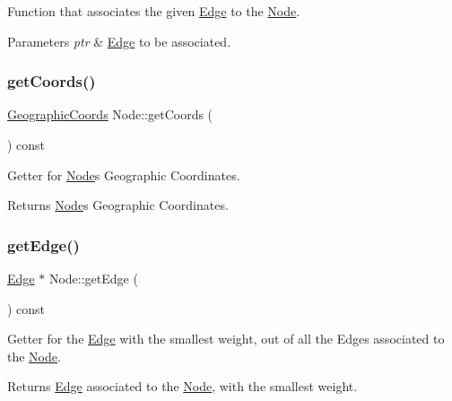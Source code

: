 Function that associates the given \hyperlink{class_edge}{Edge} to the \hyperlink{class_node}{Node}.


\begin{DoxyParams}{Parameters}
{\em ptr} & \hyperlink{class_edge}{Edge} to be associated. \\
\hline
\end{DoxyParams}
\hypertarget{class_node_a77aeb1b8ddb7776e097f5ad8a56bd0d0}{}\label{class_node_a77aeb1b8ddb7776e097f5ad8a56bd0d0} 
\subsubsection{\texorpdfstring{get\+Coords()}{getCoords()}}
{\footnotesize\ttfamily \hyperlink{class_geographic_coords}{Geographic\+Coords} Node\+::get\+Coords (\begin{DoxyParamCaption}{ }\end{DoxyParamCaption}) const}

Getter for \hyperlink{class_node}{Node}\textquotesingle{}s Geographic Coordinates.

\begin{DoxyReturn}{Returns}
\hyperlink{class_node}{Node}\textquotesingle{}s Geographic Coordinates. 
\end{DoxyReturn}
\hypertarget{class_node_a108b79d820efdc2768a148e9308b3c31}{}\label{class_node_a108b79d820efdc2768a148e9308b3c31} 
\subsubsection{\texorpdfstring{get\+Edge()}{getEdge()}\hspace{0.1cm}{\footnotesize\ttfamily [1/2]}}
{\footnotesize\ttfamily \hyperlink{class_edge}{Edge} $\ast$ Node\+::get\+Edge (\begin{DoxyParamCaption}{ }\end{DoxyParamCaption}) const}

Getter for the \hyperlink{class_edge}{Edge} with the smallest weight, out of all the Edges associated to the \hyperlink{class_node}{Node}.

\begin{DoxyReturn}{Returns}
\hyperlink{class_edge}{Edge} associated to the \hyperlink{class_node}{Node}, with the smallest weight. 
\end{DoxyReturn}
\hypertarget{class_node_aaf31a7f0f8e4dea82e48b1b09b89c217}{}\label{class_node_aaf31a7f0f8e4dea82e48b1b09b89c217} 
